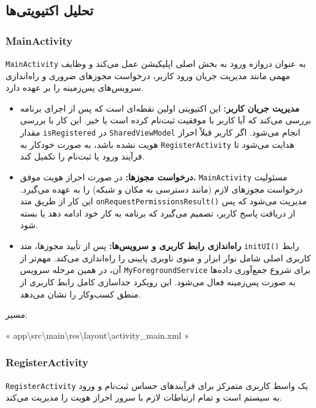 \documentclass{report}
\begin{document}
\subsection{تحلیل اکتیویتی‌ها}

\subsubsection{MainActivity}
\texttt{MainActivity} به عنوان دروازه ورود به بخش اصلی اپلیکیشن عمل می‌کند و وظایف مهمی مانند مدیریت جریان ورود کاربر، 
درخواست مجوزهای ضروری و راه‌اندازی سرویس‌های پس‌زمینه را بر عهده دارد.

\begin{itemize}
	\item \textbf{مدیریت جریان کاربر:} این اکتیویتی اولین نقطه‌ای است که پس از اجرای برنامه بررسی می‌کند که آیا کاربر با موفقیت ثبت‌نام کرده است یا خیر. این کار با بررسی مقدار \texttt{isRegistered} در \texttt{SharedViewModel} انجام می‌شود. اگر کاربر قبلاً احراز هویت نشده باشد، به صورت خودکار به \texttt{RegisterActivity} هدایت می‌شود تا فرآیند ورود یا ثبت‌نام را تکمیل کند.
	
	\item \textbf{درخواست مجوزها:} در صورت احراز هویت موفق، \texttt{MainActivity} مسئولیت درخواست مجوزهای لازم (مانند دسترسی به مکان و شبکه) را به عهده می‌گیرد. این کار از طریق متد \texttt{onRequestPermissionsResult()} مدیریت می‌شود که پس از دریافت پاسخ کاربر، تصمیم می‌گیرد که برنامه به کار خود ادامه دهد یا بسته شود.
	
	\item \textbf{راه‌اندازی رابط کاربری و سرویس‌ها:} پس از تأیید مجوزها، متد \texttt{initUI()} رابط کاربری اصلی شامل نوار ابزار و منوی ناوبری پایینی را راه‌اندازی می‌کند. مهم‌تر از آن، در همین مرحله سرویس \texttt{MyForegroundService} برای شروع جمع‌آوری داده‌ها به صورت پس‌زمینه فعال می‌شود. این رویکرد جداسازی کامل رابط کاربری از منطق کسب‌وکار را نشان می‌دهد.
\end{itemize}
\begin{note}{مسیر:}
	\begin{latin}
		« app\textbackslash src\textbackslash main\textbackslash res\textbackslash layout\textbackslash activity\_main.xml »
	\end{latin}
\end{note}
\subsubsection{RegisterActivity}
\texttt{RegisterActivity} یک واسط کاربری متمرکز برای فرآیندهای حساس ثبت‌نام و ورود به سیستم است و تمام ارتباطات لازم با سرور احراز هویت را مدیریت می‌کند.
\end{document}
